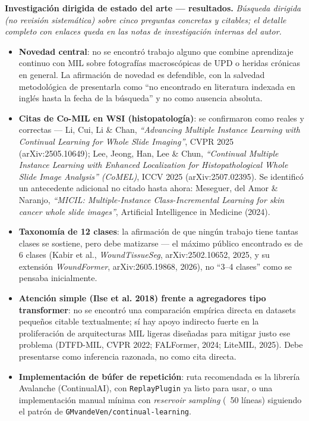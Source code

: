 \documentclass[12pt,letterpaper]{report}
\newcommand{\entrada}[2]{%
    \vspace{0.6em}
    \noindent\textbf{#1.} \textit{#2}
    \vspace{0.3em}
    \par
}
\begin{document}
\entrada{Investigación dirigida de estado del arte --- resultados}{Búsqueda dirigida (no revisión
sistemática) sobre cinco preguntas concretas y citables; el detalle completo con enlaces queda en
las notas de investigación internas del autor.}

\begin{itemize}[leftmargin=1.5em]
    \item \textbf{Novedad central}: no se encontró trabajo alguno que combine aprendizaje continuo
        con MIL sobre fotografías macroscópicas de UPD o heridas crónicas en general. La afirmación
        de novedad es defendible, con la salvedad metodológica de presentarla como ``no encontrado
        en literatura indexada en inglés hasta la fecha de la búsqueda'' y no como ausencia
        absoluta.
    \item \textbf{Citas de Co-MIL en WSI (histopatología)}: se confirmaron como reales y correctas
        --- Li, Cui, Li \& Chan, \emph{``Advancing Multiple Instance Learning with Continual
        Learning for Whole Slide Imaging''}, CVPR 2025 (arXiv:2505.10649); Lee, Jeong, Han, Lee \&
        Chun, \emph{``Continual Multiple Instance Learning with Enhanced Localization for
        Histopathological Whole Slide Image Analysis'' (CoMEL)}, ICCV 2025 (arXiv:2507.02395). Se
        identificó un antecedente adicional no citado hasta ahora: Meseguer, del Amor \& Naranjo,
        \emph{``MICIL: Multiple-Instance Class-Incremental Learning for skin cancer whole slide
        images''}, Artificial Intelligence in Medicine (2024).
    \item \textbf{Taxonomía de 12 clases}: la afirmación de que ningún trabajo tiene tantas clases
        se sostiene, pero debe matizarse --- el máximo público encontrado es de 6 clases
        (Kabir et al., \emph{WoundTissueSeg}, arXiv:2502.10652, 2025, y su extensión
        \emph{WoundFormer}, arXiv:2605.19868, 2026), no ``3--4 clases'' como se pensaba
        inicialmente.
    \item \textbf{Atención simple (Ilse et al. 2018) frente a agregadores tipo transformer}: no se
        encontró una comparación empírica directa en datasets pequeños citable textualmente; sí hay
        apoyo indirecto fuerte en la proliferación de arquitecturas MIL ligeras diseñadas para
        mitigar justo ese problema (DTFD-MIL, CVPR 2022; FALFormer, 2024; LiteMIL, 2025). Debe
        presentarse como inferencia razonada, no como cita directa.
    \item \textbf{Implementación de búfer de repetición}: ruta recomendada es la librería Avalanche
        (ContinualAI), con \texttt{ReplayPlugin} ya listo para usar, o una implementación manual
        mínima con \emph{reservoir sampling} (~50 líneas) siguiendo el patrón de
        \texttt{GMvandeVen/continual-learning}.
\end{itemize}
\end{document}
